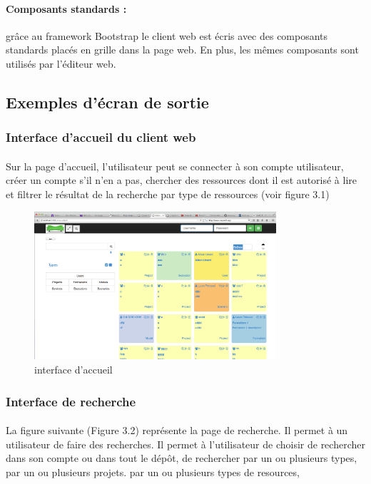 \documentclass{report}
\begin{document}
\paragraph{Composants standards :} grâce au framework Bootstrap le client web est écris avec des composants standards
placés en grille dans la page web. En plus, les mêmes composants sont utilisés par l'éditeur web.

\subsection{Exemples d'écran de sortie}

\subsubsection{Interface d'accueil du client web}

\paragraph{}
Sur la page d'accueil, l'utilisateur peut se connecter à son compte utilisateur, créer un compte s'il n'en a pas, chercher
des ressources dont il est autorisé à lire et filtrer le résultat de la recherche par type de ressources (voir figure 3.1)

\newpage

\begin{figure}[h!]
     \centering
     \includegraphics[width=0.8\textwidth] {img/1-ecran-create-user}
     \caption{interface d'accueil}
\end{figure}

\subsubsection{Interface de recherche}

\paragraph{}
La figure suivante (Figure 3.2) représente la page de recherche. Il permet à un utilisateur de faire des recherches.
Il permet à l'utilisateur de choisir de rechercher dans son compte ou dans tout le dépôt, de rechercher par un ou
plusieurs types, par un ou plusieurs projets.
 par
un ou plusieurs types de resources, 
\end{document}
